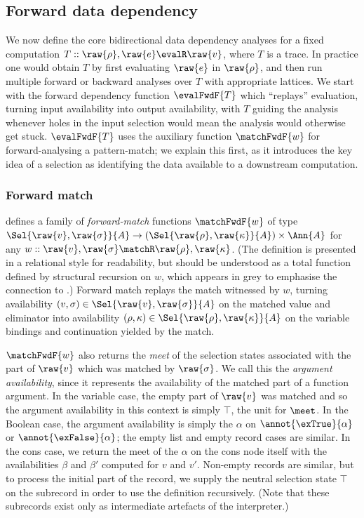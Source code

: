\subsection{Forward data dependency}
\label{sec:data-dependencies:analyses:fwd}

We now define the core bidirectional data dependency analyses for a fixed computation $T :: \raw{\rho}, \raw{e} \evalR \raw{v}$, where $T$ is a trace. In practice one would obtain $T$ by first evaluating $\raw{e}$ in $\raw{\rho}$, and then run multiple forward or backward analyses over $T$ with appropriate lattices. We start with the forward dependency function $\evalFwdF{T}$ which ``replays'' evaluation, turning input availability into output availability, with $T$ guiding the analysis whenever holes in the input selection would mean the analysis would otherwise get stuck. $\evalFwdF{T}$ uses the auxiliary function $\matchFwdF{w}$ for forward-analysing a pattern-match; we explain this first, as it introduces the key idea of a selection as identifying the data available to a downstream computation.

\subsubsection{Forward match}
\label{sec:data-dependencies:analyses:fwd:pattern-match}

 defines a family of \emph{forward-match} functions $\matchFwdF{w}$ of type $\Sel{\raw{v}, \raw{\sigma}}{A} \to (\Sel{\raw{\rho}, \raw{\kappa}}{A}) \times \Ann{A}$ for any $w :: \raw{v}, \raw{\sigma} \matchR \raw{\rho}, \raw{\kappa}$. (The definition is presented in a relational style for readability, but should be understood as a total function defined by structural recursion on $w$, which appears in grey to emphasise the connection to .) Forward match replays the match witnessed by $w$, turning availability $(v,\sigma) \in \Sel{\raw{v},\raw{\sigma}}{A}$ on the matched value and eliminator into availability $(\rho,\kappa) \in \Sel{\raw{\rho},{\raw{\kappa}}}{A}$ on the variable bindings and continuation yielded by the match.

$\matchFwdF{w}$ also returns the \emph{meet} of the selection states associated with the part of $\raw{v}$ which was matched by $\raw{\sigma}$. We call this the \emph{argument availability}, since it represents the availability of the matched part of a function argument. In the variable case, the empty part of $\raw{v}$ was matched and so the argument availability in this context is simply $\top$, the unit for $\meet$. In the Boolean case, the argument availability is simply the $\alpha$ on $\annot{\exTrue}{\alpha}$ or $\annot{\exFalse}{\alpha}$; the empty list and empty record cases are similar. In the cons case, we return the meet of the $\alpha$ on the cons node itself with the availabilities $\beta$ and $\beta'$ computed for $v$ and $v'$. Non-empty records are similar, but to process the initial part of the record, we supply the neutral selection state $\top$ on the subrecord in order to use the definition recursively. (Note that these subrecords exist only as intermediate artefacts of the interpreter.)

